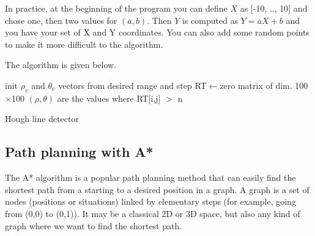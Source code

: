 \documentclass{ecnreport}
\begin{document}
 In practice, at the beginning of the program you can define $X$ as [-10, .., 10] and chose one, then two values for $(a,b)$.
 Then $Y$ is computed as $Y=aX+b$ and you have your set of X and Y coordinates. You can also add some random points to make it more difficult to the algorithm.
 
 The algorithm is given below.

 
\begin{algorithm}[!h]
{}
init $\rho_v$ and $\theta_v$ vectors from desired range and step\;
RT$\gets$zero matrix of dim. 100$\times$100\;
$(\rho,\theta)$ are the values where RT[i,j] $>$ n\;
\caption{Hough line detector}
\label{algo:hough}
\end{algorithm}

\begin{itemize}
 \end{itemize}
 
 
 
 
 \subsection{Path planning with A*}
 
 The A* algorithm is a popular path planning method that can easily find the shortest path from a starting to a desired position in a graph. 
 A graph is a set of nodes (positions or situations) linked by elementary steps (for example, going from (0,0) to (0,1)). It may be a classical 2D or 3D space, but
 also any kind of graph where we want to find the shortest path. 
 
 \begin{itemize}
 \end{itemize}
 
\end{document}
